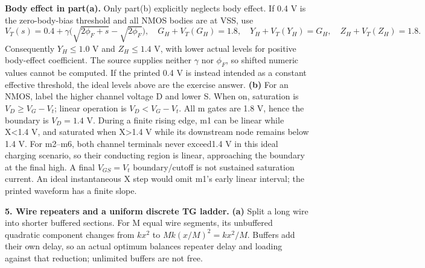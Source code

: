 \documentclass[10pt]{article}
\begin{document}
\textbf{Body effect in part(a).} Only part(b) explicitly neglects body effect. If 0.4 V is the zero-body-bias threshold and all NMOS bodies are at VSS, use
\[V_T(s)=0.4+\gamma\bigl(\sqrt{2\phi_F+s}-\sqrt{2\phi_F}\bigr),\quad
G_H+V_T(G_H)=1.8,\quad Y_H+V_T(Y_H)=G_H,\quad Z_H+V_T(Z_H)=1.8.\]
Consequently $Y_H\leq1.0$ V and $Z_H\leq1.4$ V, with lower actual levels for positive body-effect coefficient. The source supplies neither $\gamma$ nor $\phi_F$, so shifted numeric values cannot be computed. If the printed 0.4 V is instead intended as a constant effective threshold, the ideal levels above are the exercise answer.
\textbf{(b)} For an NMOS, label the higher channel voltage D and lower S. When on, saturation is $V_D\geq V_G-V_t$; linear operation is $V_D<V_G-V_t$. All m gates are 1.8 V, hence the boundary is $V_D=1.4$ V. During a finite rising edge, m1 can be linear while X<1.4 V, and saturated when X>1.4 V while its downstream node remains below 1.4 V. For m2--m6, both channel terminals never exceed1.4 V in this ideal charging scenario, so their conducting region is linear, approaching the boundary at the final high. A final $V_{GS}=V_t$ boundary/cutoff is not sustained saturation current. An ideal instantaneous X step would omit m1's early linear interval; the printed waveform has a finite slope.

\newpage\textbf{5. Wire repeaters and a uniform discrete TG ladder.}
\textbf{(a)} Split a long wire into shorter buffered sections. For M equal wire segments, its unbuffered quadratic component changes from $kx^2$ to $M k(x/M)^2=kx^2/M$. Buffers add their own delay, so an actual optimum balances repeater delay and loading against that reduction; unlimited buffers are not free.
\end{document}
